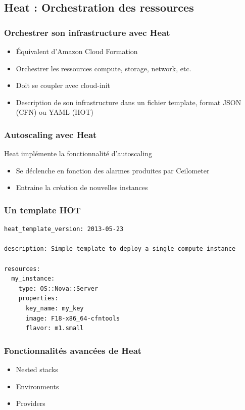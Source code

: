   \subsection[Heat]{Heat : Orchestration des ressources}

  \begin{frame}
    \frametitle{Orchestrer son infrastructure avec Heat}
    \begin{itemize}
      \item Équivalent d'Amazon Cloud Formation
      \item Orchestrer les ressources compute, storage, network, etc.
      \item Doit se coupler avec cloud-init\pause
      \item Description de son infrastructure dans un fichier template, format JSON (CFN) ou YAML (HOT)
    \end{itemize}
  \end{frame}

  \begin{frame}
    \frametitle{Autoscaling avec Heat}
    Heat implémente la fonctionnalité d'autoscaling
    \begin{itemize}
      \item Se déclenche en fonction des alarmes produites par Ceilometer
      \item Entraine la création de nouvelles instances
    \end{itemize}
  \end{frame}

  \begin{frame}[containsverbatim]
    \frametitle{Un template HOT}
\begin{verbatim}
heat_template_version: 2013-05-23

description: Simple template to deploy a single compute instance

resources:
  my_instance:
    type: OS::Nova::Server
    properties:
      key_name: my_key
      image: F18-x86_64-cfntools
      flavor: m1.small
\end{verbatim}
  \end{frame}

  \begin{frame}
    \frametitle{Fonctionnalités avancées de Heat}
    \begin{itemize}
      \item Nested stacks
      \item Environments
      \item Providers
    \end{itemize}
  \end{frame}

